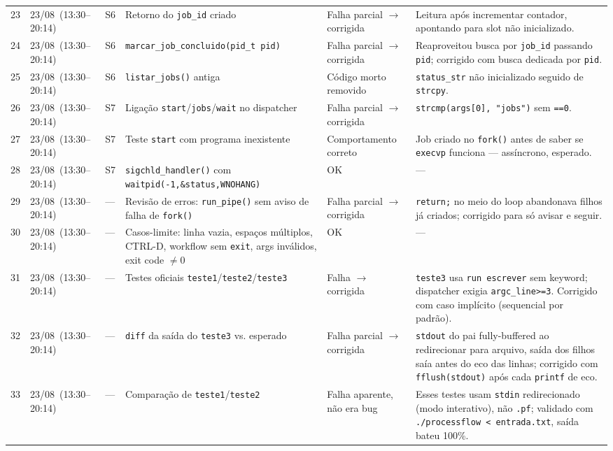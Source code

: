 \documentclass[11pt,a4paper]{article}
\begin{document}
\begin{longtable}{L{0.5cm} L{2.6cm} L{1.1cm} L{3.4cm} L{2.3cm} L{6.2cm}}
23 & 23/08\allowbreak\ (13:30--20:14) & S6 & Retorno do \texttt{job\_id} criado & Falha parcial $\to$ corrigida & Leitura após incrementar contador, apontando para slot não inicializado. \\
24 & 23/08\allowbreak\ (13:30--20:14) & S6 & \texttt{marcar\_job\_concluido(pid\_t pid)} & Falha parcial $\to$ corrigida & Reaproveitou busca por \texttt{job\_id} passando \texttt{pid}; corrigido com busca dedicada por \texttt{pid}. \\
25 & 23/08\allowbreak\ (13:30--20:14) & S6 & \texttt{listar\_jobs()} antiga & Código morto removido & \texttt{status\_str} não inicializado seguido de \texttt{strcpy}. \\
26 & 23/08\allowbreak\ (13:30--20:14) & S7 & Ligação \texttt{start}/\texttt{jobs}/\texttt{wait} no dispatcher & Falha parcial $\to$ corrigida & \texttt{strcmp(args[0], "jobs")} sem \texttt{==0}. \\
27 & 23/08\allowbreak\ (13:30--20:14) & S7 & Teste \texttt{start} com programa inexistente & Comportamento correto & Job criado no \texttt{fork()} antes de saber se \texttt{execvp} funciona --- assíncrono, esperado. \\
28 & 23/08\allowbreak\ (13:30--20:14) & S7 & \texttt{sigchld\_handler()} com \texttt{waitpid(-1,\allowbreak\&status,\allowbreak WNOHANG)} & OK & --- \\
29 & 23/08\allowbreak\ (13:30--20:14) & --- & Revisão de erros: \texttt{run\_pipe()} sem aviso de falha de \texttt{fork()} & Falha parcial $\to$ corrigida & \texttt{return;} no meio do loop abandonava filhos já criados; corrigido para só avisar e seguir. \\
30 & 23/08\allowbreak\ (13:30--20:14) & --- & Casos-limite: linha vazia, espaços múltiplos, CTRL-D, workflow sem \texttt{exit}, args inválidos, exit code $\neq$0 & OK & --- \\
31 & 23/08\allowbreak\ (13:30--20:14) & --- & Testes oficiais \texttt{teste1}/\texttt{teste2}/\texttt{teste3} & Falha $\to$ corrigida & \texttt{teste3} usa \texttt{run escrever} sem keyword; dispatcher exigia \texttt{argc\_line>=3}. Corrigido com caso implícito (sequencial por padrão). \\
32 & 23/08\allowbreak\ (13:30--20:14) & --- & \texttt{diff} da saída do \texttt{teste3} vs. esperado & Falha parcial $\to$ corrigida & \texttt{stdout} do pai fully-buffered ao redirecionar para arquivo, saída dos filhos saía antes do eco das linhas; corrigido com \texttt{fflush(stdout)} após cada \texttt{printf} de eco. \\
33 & 23/08\allowbreak\ (13:30--20:14) & --- & Comparação de \texttt{teste1}/\texttt{teste2} & Falha aparente, não era bug & Esses testes usam \texttt{stdin} redirecionado (modo interativo), não \texttt{.pf}; validado com \texttt{./processflow < entrada.txt}, saída bateu 100\%. \\
\bottomrule
\end{longtable}
\end{document}
